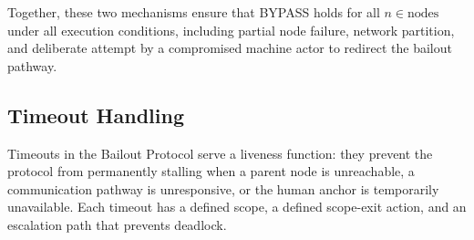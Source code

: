 Together, these two mechanisms ensure that BYPASS holds for all $n \in \text{nodes}$ under all execution conditions, including partial node failure, network partition, and deliberate attempt by a compromised machine actor to redirect the bailout pathway.

\subsection{Timeout Handling}\label{sec:timeout-handling}

Timeouts in the Bailout Protocol serve a liveness function: they prevent the protocol from permanently stalling when a parent node is unreachable, a communication pathway is unresponsive, or the human anchor is temporarily unavailable. Each timeout has a defined scope, a defined scope-exit action, and an escalation path that prevents deadlock.

